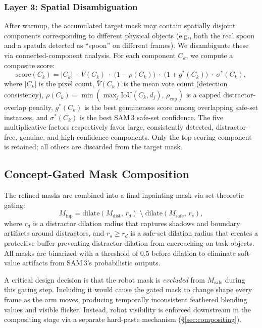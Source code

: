 \subsubsection{Layer 3: Spatial Disambiguation}
\label{sec:spatial}

After warmup, the accumulated target mask may contain spatially disjoint components corresponding to different physical objects (e.g., both the real spoon and a spatula detected as ``spoon'' on different frames). We disambiguate these via connected-component analysis. For each component $C_k$, we compute a composite score:
\begin{equation}
    \text{score}(C_k) = |C_k| \;\cdot\; \bar{V}(C_k) \;\cdot\; \bigl(1 - \rho(C_k)\bigr) \;\cdot\; \bigl(1 + g^*(C_k)\bigr) \;\cdot\; \sigma^*(C_k),
    \label{eq:layer3}
\end{equation}
where $|C_k|$ is the pixel count, $\bar{V}(C_k)$ is the mean vote count (detection consistency), $\rho(C_k) = \min(\max_j \text{IoU}(C_k, d_j),\, \rho_{\text{cap}})$ is a capped distractor-overlap penalty, $g^*(C_k)$ is the best genuineness score among overlapping safe-set instances, and $\sigma^*(C_k)$ is the best SAM\,3 safe-set confidence. The five multiplicative factors respectively favor large, consistently detected, distractor-free, genuine, and high-confidence components. Only the top-scoring component is retained; all others are discarded from the target mask.

\subsection{Concept-Gated Mask Composition}
\label{sec:gating}

The refined masks are combined into a final inpainting mask via set-theoretic gating:
\begin{equation}
    M_{\text{inp}} = \text{dilate}(M_{\text{dist}},\, r_d) \;\setminus\; \text{dilate}(M_{\text{safe}},\, r_s),
    \label{eq:gating}
\end{equation}
where $r_d$ is a distractor dilation radius that captures shadows and boundary artifacts around distractors, and $r_s \geq r_d$ is a safe-set dilation radius that creates a protective buffer preventing distractor dilation from encroaching on task objects. All masks are binarized with a threshold of $0.5$ before dilation to eliminate soft-value artifacts from SAM\,3's probabilistic outputs.

A critical design decision is that the robot mask is \emph{excluded} from $M_{\text{safe}}$ during this gating step. Including it would cause the gated mask to change shape every frame as the arm moves, producing temporally inconsistent feathered blending values and visible flicker. Instead, robot visibility is enforced downstream in the compositing stage via a separate hard-paste mechanism (\S\ref{sec:compositing}).

